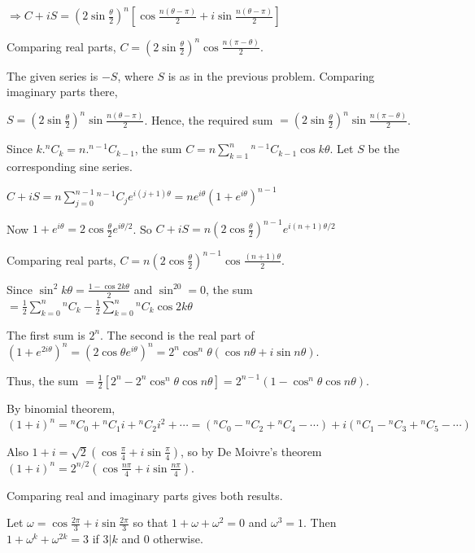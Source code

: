   $\Rightarrow C + iS = \left(2\sin\frac{\theta}{2}\right)^n\left[\cos\frac{n(\theta - \pi)}{2} +
  i\sin\frac{n(\theta - \pi)}{2}\right]$

  Comparing real parts, $C = \left(2\sin\frac{\theta}{2}\right)^n\cos\frac{n(\pi - \theta)}{2}$.
\item The given series is $-S$, where $S$ is as in the previous problem. Comparing imaginary parts there,

  $S = \left(2\sin\frac{\theta}{2}\right)^n\sin\frac{n(\theta - \pi)}{2}$. Hence, the required sum $=
  \left(2\sin\frac{\theta}{2}\right)^n\sin\frac{n(\pi - \theta)}{2}$.
\item Since $k.{}^nC_k = n.{}^{n - 1}C_{k - 1}$, the sum $C = n\displaystyle\sum_{k = 1}^n{}^{n - 1}C_{k -
    1}\cos k\theta$. Let $S$ be the corresponding sine series.

  $C + iS = n\displaystyle\sum_{j = 0}^{n - 1}{}^{n - 1}C_je^{i(j + 1)\theta} = ne^{i\theta}\left(1 +
  e^{i\theta}\right)^{n - 1}$

  Now $1 + e^{i\theta} = 2\cos\frac{\theta}{2}e^{i\theta/2}$. So $C + iS = n\left(2\cos\frac{\theta}{2}\right)^{n
    - 1}e^{i(n + 1)\theta/2}$

  Comparing real parts, $C = n\left(2\cos\frac{\theta}{2}\right)^{n - 1}\cos\frac{(n + 1)\theta}{2}$.
\item Since $\sin^2k\theta = \frac{1 - \cos2k\theta}{2}$ and $\sin^20 = 0$, the sum $=
  \frac{1}{2}\displaystyle\sum_{k = 0}^n{}^nC_k - \frac{1}{2}\displaystyle\sum_{k = 0}^n{}^nC_k\cos2k\theta$

  The first sum is $2^n$. The second is the real part of $\left(1 + e^{2i\theta}\right)^n =
  \left(2\cos\theta e^{i\theta}\right)^n = 2^n\cos^n\theta(\cos n\theta + i\sin n\theta)$.

  Thus, the sum $= \frac{1}{2}\left[2^n - 2^n\cos^n\theta\cos n\theta\right] = 2^{n - 1}\left(1 -
  \cos^n\theta\cos n\theta\right)$.
\item By binomial theorem, $(1 + i)^n = {}^nC_0 + {}^nC_1i + {}^nC_2i^2 + \cdots = \left({}^nC_0 - {}^nC_2 +
  {}^nC_4 - \cdots\right) + i\left({}^nC_1 - {}^nC_3 + {}^nC_5 - \cdots\right)$

  Also $1 + i = \sqrt{2}\left(\cos\frac{\pi}{4} + i\sin\frac{\pi}{4}\right)$, so by De Moivre's theorem $(1 +
  i)^n = 2^{n/2}\left(\cos\frac{n\pi}{4} + i\sin\frac{n\pi}{4}\right)$.

  Comparing real and imaginary parts gives both results.
\item Let $\omega = \cos\frac{2\pi}{3} + i\sin\frac{2\pi}{3}$ so that $1 + \omega + \omega^2 = 0$ and
  $\omega^3 = 1$. Then $1 + \omega^k + \omega^{2k} = 3$ if $3 | k$ and $0$ otherwise.

